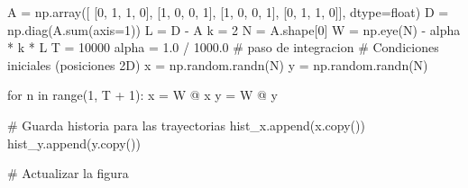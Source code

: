 \begin{python}
A = np.array([
[0, 1, 1, 0],
[1, 0, 0, 1],
[1, 0, 0, 1],
[0, 1, 1, 0]], dtype=float)
D = np.diag(A.sum(axis=1))
L = D - A
k = 2
N = A.shape[0]
W = np.eye(N) - alpha * k * L 
T = 10000                  
alpha = 1.0 / 1000.0      # paso de integracion
# Condiciones iniciales (posiciones 2D) 
x = np.random.randn(N)   
y = np.random.randn(N)  


for n in range(1, T + 1):
    x = W @ x
    y = W @ y

    # Guarda historia para las trayectorias
    hist_x.append(x.copy())
    hist_y.append(y.copy())

    # Actualizar la figura



\end{python}
